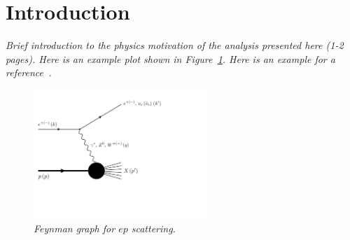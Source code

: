 \section{Introduction}\label{sec:introduction}

\noindent \textit{Brief introduction to the physics motivation of the analysis presented here (1-2 pages). Here is an example plot shown in Figure~\ref{Fig1}. Here is an example for a reference~\cite{AbdulKhalek:2021gbh}.}

\begin{figure}[H]
\centerline{\includegraphics[width=65mm]{ep_Feynman_graph}}
\caption[Figure 1 text]{\it Feynman graph for $ep$ scattering.}
\label{Fig1}
\end{figure}
